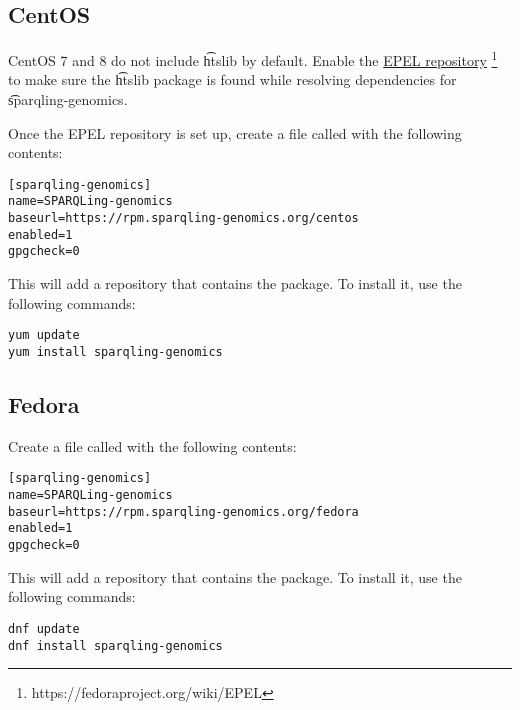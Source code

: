 \subsection{CentOS}

  CentOS 7 and 8 do not include \t{htslib} by default.  Enable the
  \href{https://fedoraproject.org/wiki/EPEL}{EPEL repository}%
  \footnote{https://fedoraproject.org/wiki/EPEL} to make sure the
  \t{htslib} package is found while resolving dependencies for
  \t{sparqling-genomics}.

  Once the EPEL repository is set up, create a file called
   with the following contents:

\begin{siderules}
\begin{verbatim}
[sparqling-genomics]
name=SPARQLing-genomics
baseurl=https://rpm.sparqling-genomics.org/centos
enabled=1
gpgcheck=0
\end{verbatim}
\end{siderules}

This will add a repository that contains the  package.
To install it, use the following commands:

\begin{siderules}
\begin{verbatim}
yum update
yum install sparqling-genomics
\end{verbatim}
\end{siderules}

\subsection{Fedora}

Create a file called 
with the following contents:

\begin{siderules}
\begin{verbatim}
[sparqling-genomics]
name=SPARQLing-genomics
baseurl=https://rpm.sparqling-genomics.org/fedora
enabled=1
gpgcheck=0
\end{verbatim}
\end{siderules}

This will add a repository that contains the  package.
To install it, use the following commands:

\begin{siderules}
\begin{verbatim}
dnf update
dnf install sparqling-genomics
\end{verbatim}
\end{siderules}

